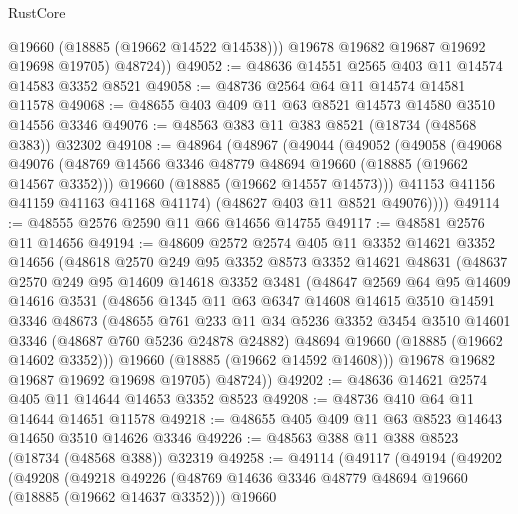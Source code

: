 \begin{lexlean}{RustCore}
\begin{coremodule}
            @19660
            (@18885 (@19662 @14522 @14538)))
          @19678
          @19682
          @19687
          @19692
          @19698
          @19705)
        @48724))
@49052 := @48636 @14551 @2565 @403 @11 @14574 @14583 @3352 @8521
@49058 := @48736 @2564 @64 @11 @14574 @14581 @11578
@49068 := @48655 @403 @409 @11 @63 @8521 @14573 @14580 @3510 @14556 @3346
@49076 := @48563 @383 @11 @383 @8521 (@18734 (@48568 @383)) @32302
@49108 := @48964
    (@48967
      (@49044
        (@49052
          (@49058
            (@49068
              @49076
              (@48769 @14566 @3346 @48779 @48694 @19660 (@18885 (@19662 @14567 @3352)))
              @19660
              (@18885 (@19662 @14557 @14573)))
            @41153
            @41156
            @41159
            @41163
            @41168
            @41174)
          (@48627 @403 @11 @8521 @49076))))
@49114 := @48555 @2576 @2590 @11 @66 @14656 @14755
@49117 := @48581 @2576 @11 @14656
@49194 := @48609
    @2572
    @2574
    @405
    @11
    @3352
    @14621
    @3352
    @14656
    (@48618
      @2570
      @249
      @95
      @3352
      @8573
      @3352
      @14621
      @48631
      (@48637
        @2570
        @249
        @95
        @14609
        @14618
        @3352
        @3481
        (@48647
          @2569
          @64
          @95
          @14609
          @14616
          @3531
          (@48656
            @1345
            @11
            @63
            @6347
            @14608
            @14615
            @3510
            @14591
            @3346
            @48673
            (@48655
              @761
              @233
              @11
              @34
              @5236
              @3352
              @3454
              @3510
              @14601
              @3346
              (@48687 @760 @5236 @24878 @24882)
              @48694
              @19660
              (@18885 (@19662 @14602 @3352)))
            @19660
            (@18885 (@19662 @14592 @14608)))
          @19678
          @19682
          @19687
          @19692
          @19698
          @19705)
        @48724))
@49202 := @48636 @14621 @2574 @405 @11 @14644 @14653 @3352 @8523
@49208 := @48736 @410 @64 @11 @14644 @14651 @11578
@49218 := @48655 @405 @409 @11 @63 @8523 @14643 @14650 @3510 @14626 @3346
@49226 := @48563 @388 @11 @388 @8523 (@18734 (@48568 @388)) @32319
@49258 := @49114
    (@49117
      (@49194
        (@49202
          (@49208
            (@49218
              @49226
              (@48769 @14636 @3346 @48779 @48694 @19660 (@18885 (@19662 @14637 @3352)))
              @19660

\end{coremodule}
\end{lexlean}
